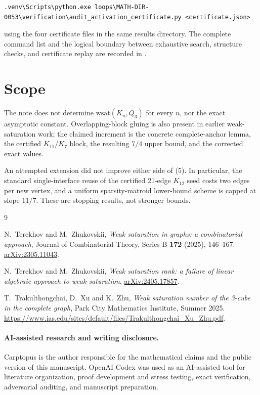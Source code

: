 \documentclass[11pt]{article}
\numberwithin{equation}{section}
\begin{document}
\begin{Verbatim}[fontsize=\scriptsize,breaklines=true,breakanywhere=true]
.venv\Scripts\python.exe loops\MATH-DIR-0053\verification\audit_activation_certificate.py <certificate.json>
\end{Verbatim}


using the four certificate files in the same results directory. The complete command list and the
logical boundary between exhaustive search, structure checks, and certificate replay are recorded
in {\small{}}.

\section{Scope}


The note does not determine $\mathrm{wsat}(K_n,Q_3)$ for every $n$, nor the exact asymptotic
constant. Overlapping-block gluing is also present in earlier weak-saturation work; the claimed
increment is the concrete complete-anchor lemma, the certified $K_{11}/K_7$ block, the resulting
$7/4$ upper bound, and the corrected exact values.

An attempted extension did not improve either side of (5). In particular, the standard
single-interface reuse of the certified 21-edge $K_{12}$ seed costs two edges per new vertex, and a
uniform sparsity-matroid lower-bound scheme is capped at slope $11/7$. These are stopping results,
not stronger bounds.

\begin{thebibliography}{9}
\footnotesize
\raggedright

N.~Terekhov and M.~Zhukovskii,
\emph{Weak saturation in graphs: a combinatorial approach},
Journal of Combinatorial Theory, Series B \textbf{172} (2025), 146--167.
\href{https://arxiv.org/abs/2305.11043}{arXiv:2305.11043}.

N.~Terekhov and M.~Zhukovskii,
\emph{Weak saturation rank: a failure of linear algebraic approach to weak saturation},
\href{https://arxiv.org/abs/2405.17857}{arXiv:2405.17857}.

T.~Trakulthongchai, D.~Xu and K.~Zhu,
\emph{Weak saturation number of the 3-cube in the complete graph},
Park City Mathematics Institute, Summer 2025.
\url{https://www.ias.edu/sites/default/files/Trakulthongchai_Xu_Zhu.pdf}.

\end{thebibliography}

\paragraph{AI-assisted research and writing disclosure.}
Carptopus is the author responsible for the mathematical claims and the public version of this
manuscript. OpenAI Codex was used as an AI-assisted tool for literature organization, proof
development and stress testing, exact verification, adversarial auditing, and manuscript
preparation.
\end{document}
